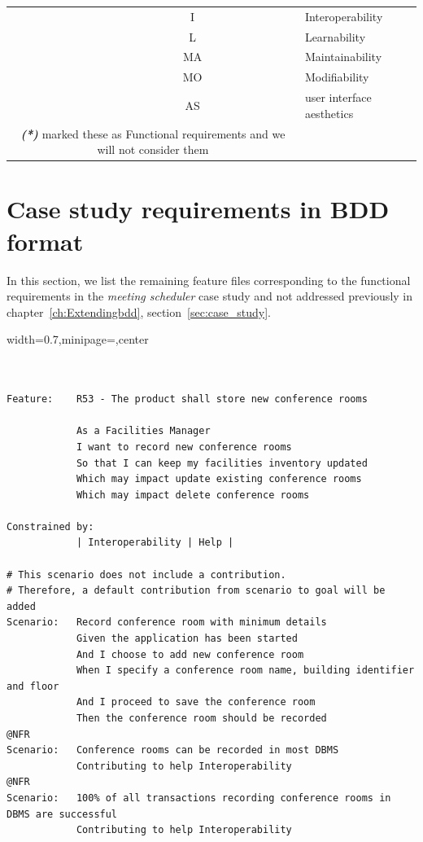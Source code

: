 \documentclass[dissertation,final]{softeng}
\newenvironment{featurecode}[1]
{ \lrbox\featurebox \begin{adjustbox}{width=#1\textwidth,minipage=\textwidth,center} }
{ \end{adjustbox}\endlrbox}
\newenvironment{featurelist}[2]
{
\newcommand{\setcaption}{\caption{#1}}
\newcommand{\setlabel}{\label{#2}}
}
{\begin{listing}[h!]\centering\usebox\featurebox\setcaption\setlabel\end{listing}}
\begin{document}
\begin{appendices}
{\begin{table}[h!]
{{\begin{tabular}{c c l}
                & I	 & Interoperability \\
                & L	 & Learnability \\
                & MA & Maintainability \\
                & MO & Modifiability \\
                & AS & user interface aesthetics \\
                \multicolumn{2}{c}{\multirow{3}[1]{*}{\emph{\bfseries{(*)}} \citet{MylopoulosOnt2014} marked these as Functional requirements and we will not consider them}} 
            \end{tabular}
        }
  }
\end{table}
}

\clearpage
\section{Case study requirements in BDD format}

In this section, we list the remaining feature files corresponding to the functional requirements in the \emph{meeting scheduler} case study and not addressed previously in chapter~\ref{ch:Extendingbdd}, section~\ref{sec:case_study}.

\begin{featurelist}{R53 -- The product shall store new conference rooms}{lst:feature_r53}
\begin{featurecode}{0.7}
\begin{verbatim}


Feature:    R53 - The product shall store new conference rooms
	
            As a Facilities Manager
            I want to record new conference rooms
            So that I can keep my facilities inventory updated
            Which may impact update existing conference rooms
            Which may impact delete conference rooms
			
Constrained by:
            | Interoperability | Help |

# This scenario does not include a contribution.
# Therefore, a default contribution from scenario to goal will be added
Scenario:   Record conference room with minimum details
            Given the application has been started
            And I choose to add new conference room
            When I specify a conference room name, building identifier and floor
            And I proceed to save the conference room
            Then the conference room should be recorded
@NFR	
Scenario:   Conference rooms can be recorded in most DBMS
            Contributing to help Interoperability
@NFR
Scenario:   100% of all transactions recording conference rooms in DBMS are successful
            Contributing to help Interoperability
\end{verbatim}
\end{featurecode}
\end{featurelist}


\end{appendices}
\end{document}
